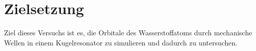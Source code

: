 \section{Zielsetzung}
Ziel dieses Versuchs ist es, die Orbitale des Wasserstoffatoms durch mechanische Wellen in einem Kugelresonator zu simulieren und dadurch zu untersuchen. 